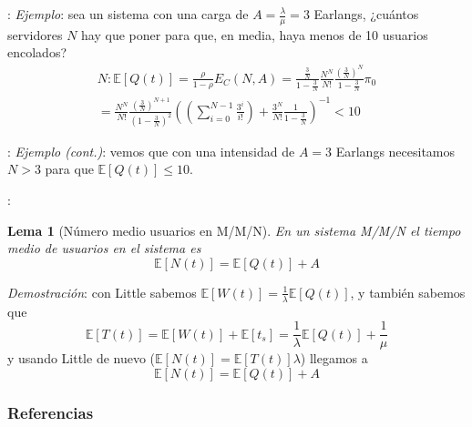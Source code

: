 \documentclass[xcolor={x11names}]{beamer}
\newtheorem{lema}{Lema}[section]
\begin{document}
\begin{frame}{\secname: \subsecname}
    \textit{Ejemplo}: sea un sistema con una
    carga de $A=\tfrac{\lambda}{\mu}=3$
    Earlangs, ¿cuántos servidores $N$ hay
    que poner para que, en media,
    haya menos de 10
    usuarios encolados?
    \begin{multline*}
        N:\mathbb{E}[Q(t)]=
        \frac{\rho}{1-\rho}E_C(N,A)
        = \frac{\tfrac{3}{N}}{1-\tfrac{3}{N}}
        \frac{N^N}{N!}\frac{\left(\frac{3}{N}\right)^N}{1-\tfrac{3}{N}}\pi_0\\
        =\frac{N^N}{N!}\frac{\left(\frac{3}{N}\right)^{N+1}}{\left(1-\tfrac{3}{N}\right)^2}
                \left(
                    \left(\sum_{i=0}^{N-1}
                    \frac{3^i}{i!}
                    \right)
                    + \frac{3^N}{N!}\frac{1}{1-\tfrac{3}{N}}
                \right)^{-1}<10
    \end{multline*}
\end{frame}





\begin{frame}{\secname: \subsecname}
    \textit{Ejemplo (cont.)}: vemos que con
    una intensidad de $A=3$ Earlangs necesitamos
    $N>3$ para que $\mathbb{E}[Q(t)]\leq 10$.
    \vfill
    \begin{figure}
        
    \end{figure}
\end{frame}





\begin{frame}{\secname: \subsecname}
    \begin{lema}[Número medio usuarios en M/M/N]
        En un sistema M/M/N el tiempo medio
        de usuarios en el sistema es
        \begin{equation}
            \mathbb{E}[N(t)]=
            \mathbb{E}[Q(t)]+A
        \end{equation}
    \end{lema}
    \vfill
    \textit{Demostración}:
    con Little sabemos
    $\mathbb{E}[W(t)]=\tfrac{1}{\lambda}
    \mathbb{E}[Q(t)]$, y también sabemos que
    \begin{equation*}
        \mathbb{E}[T(t)]
        =\mathbb{E}[W(t)]+\mathbb{E}[t_s]
        = \frac{1}{\lambda}\mathbb{E}[Q(t)]
        + \frac{1}{\mu}
    \end{equation*}
    y usando Little de nuevo
    ($\mathbb{E}[N(t)]=\mathbb{E}[T(t)]\lambda$)
    llegamos a
    \begin{equation*}
        \mathbb{E}[N(t)]=
        \mathbb{E}[Q(t)]+A
    \end{equation*}
\end{frame}




\begin{frame}[allowframebreaks]
        \frametitle{Referencias}
        
        
\end{frame}
\end{document}
